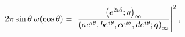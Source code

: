 \[2\pi\mathop{\sin\/}\nolimits\theta\,w(\mathop{\cos\/}\nolimits\theta)=\left|%
\frac{\left(e^{2i\theta};q\right)_{\infty}}{\left(ae^{i\theta},be^{i\theta},ce%
^{i\theta},de^{i\theta};q\right)_{\infty}}\right|^{2},\]